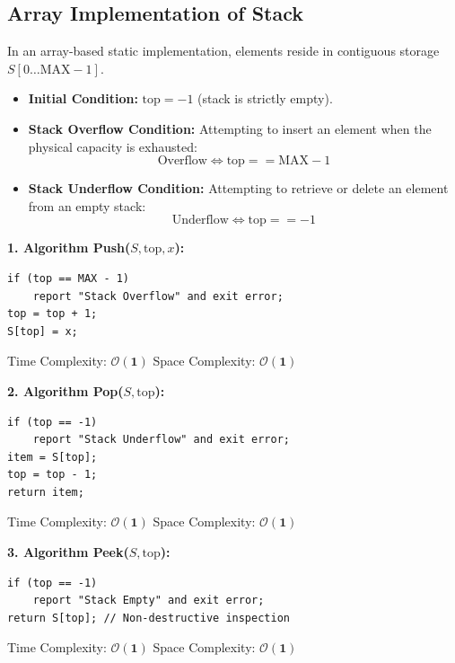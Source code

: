 \documentclass[12pt,a4paper]{article}
\begin{document}
\subsection{Array Implementation of Stack}
In an array-based static implementation, elements reside in contiguous storage $S[0 \dots \text{MAX}-1]$.
\begin{itemize}[leftmargin=*, itemsep=3pt]
  \item \textbf{Initial Condition:} $\text{top} = -1$ (stack is strictly empty).
  \item \textbf{Stack Overflow Condition:} Attempting to insert an element when the physical capacity is exhausted:
  \begin{equation}
    \text{Overflow} \iff \text{top} == \text{MAX} - 1
  \end{equation}
  \item \textbf{Stack Underflow Condition:} Attempting to retrieve or delete an element from an empty stack:
  \begin{equation}
    \text{Underflow} \iff \text{top} == -1
  \end{equation}
\end{itemize}

\begin{tcolorbox}[formulabox, title={\textbf{Core Stack Primitive Algorithms and Complexity Bounds}}]
\textbf{1. Algorithm Push($S, \text{top}, x$):}
\begin{verbatim}
if (top == MAX - 1)
    report "Stack Overflow" and exit error;
top = top + 1;
S[top] = x;
\end{verbatim}
Time Complexity: $\mathbf{\mathcal{O}(1)}$ \quad Space Complexity: $\mathbf{\mathcal{O}(1)}$

\par\vspace{3pt}\noindent
\textbf{2. Algorithm Pop($S, \text{top}$):}
\begin{verbatim}
if (top == -1)
    report "Stack Underflow" and exit error;
item = S[top];
top = top - 1;
return item;
\end{verbatim}
Time Complexity: $\mathbf{\mathcal{O}(1)}$ \quad Space Complexity: $\mathbf{\mathcal{O}(1)}$

\par\vspace{3pt}\noindent
\textbf{3. Algorithm Peek($S, \text{top}$):}
\begin{verbatim}
if (top == -1)
    report "Stack Empty" and exit error;
return S[top]; // Non-destructive inspection
\end{verbatim}
Time Complexity: $\mathbf{\mathcal{O}(1)}$ \quad Space Complexity: $\mathbf{\mathcal{O}(1)}$
\end{tcolorbox}
\end{document}
